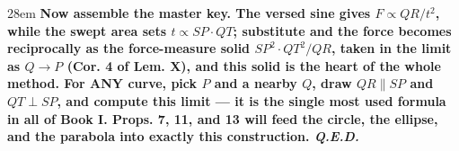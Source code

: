 \documentclass[border=4pt]{standalone}
\begin{document}
\begin{varwidth}{28em}
\large\bfseries
Now assemble the master key. The versed sine gives $F \propto QR/t^2$, while the swept area sets      $t \propto SP\cdot QT$; substitute and the force becomes reciprocally as the force-measure      solid $SP^2\cdot QT^2/QR$, taken in the limit as $Q\to P$ (Cor. 4 of Lem. X), and this solid is the heart      of the whole method. For ANY curve, pick $P$ and a nearby $Q$, draw $QR\parallel SP$ and $QT\perp SP$, and      compute this limit — it is the single most used formula in all of Book I. Props. 7, 11, and 13 will feed      the circle, the ellipse, and the parabola into exactly this construction. \textit{Q.E.D.}
\end{varwidth}
\end{document}
